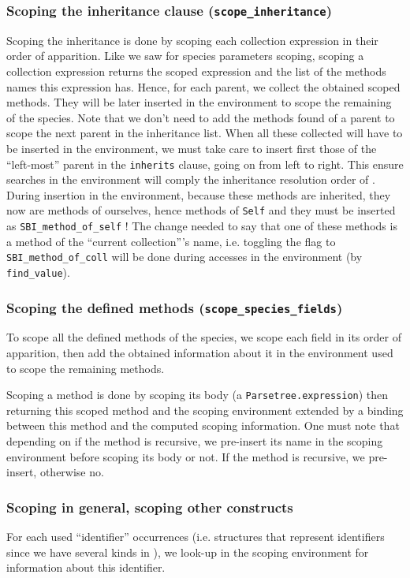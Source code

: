 \subsubsection{Scoping the inheritance clause ({\tt scope\_inheritance})}
Scoping the inheritance is done by scoping each collection expression
in their order of apparition. Like we saw for species parameters
scoping, scoping a collection expression returns the scoped expression
and the list of the methods names this expression has.
Hence, for each parent, we collect the obtained scoped methods. They
will be later inserted in the environment to scope the remaining of
the species. Note that we don't need to add the methods found of a
parent to scope the next parent in the inheritance list. When all
these collected will have to be inserted in the environment, we must
take care to insert first those of the ``left-most'' parent in the
{\tt inherits} clause, going on from left to right. This ensure
searches in the environment will comply the inheritance resolution
order of \focalize. During insertion in the environment, because these
methods are inherited, they now are methods of ourselves, hence
methods of {\tt Self} and they must be inserted as
{\tt SBI\_method\_of\_self} ! The change needed to say that one of
these methods is a method of the ``current collection'''s name,
i.e. toggling the flag to {\tt SBI\_method\_of\_coll} will be done
during accesses in the environment (by {\tt find\_value}).


\subsubsection{Scoping the defined methods ({\tt scope\_species\_fields})}
To scope all the defined methods of the species, we scope each field
in its order of apparition, then add the obtained information about it
in the environment used to scope the remaining methods.

Scoping a method is done by scoping its body (a
{\tt Parsetree.expression}) then returning this scoped method and the
scoping environment extended by a binding between this method and the
computed scoping information. One must note that depending on if the
method is recursive, we pre-insert its name in the scoping environment
before scoping its body or not. If the method is recursive, we
pre-insert, otherwise no.


\subsubsection{Scoping in general, scoping other constructs}
 For each used ``identifier'' occurrences (i.e. structures that
 represent identifiers since we have several kinds in \focalize), we
 look-up in the scoping environment for information about this
 identifier.

